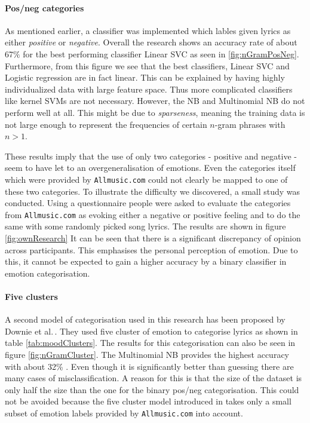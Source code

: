 \documentclass[a4paper,12pt]{article}
\begin{document}
\paragraph{Pos/neg categories} As mentioned earlier, a classifier was implemented which lables given lyrics as either \textit{positive} or \textit{negative}. Overall the research shows an accuracy rate of about 67$\%$ for the best performing classifier Linear SVC as seen in \ref{fig:nGramPosNeg}. Furthermore, from this figure we see that the best classifiers, Linear SVC and Logistic regression are in fact linear. This can be explained by having highly individualized data with large feature space. Thus more complicated classifiers like kernel SVMs are not necessary. However, the NB and Multinomial NB do not perform well at all. This might be due to \textit{sparseness}, meaning the training data is not large enough to represent the frequencies of certain $n$-gram phrases with $n > 1$.

These results imply that the use of only two categories - positive and negative - seem to have let to an overgeneralisation of emotions. Even the categories itself which were provided by \texttt{Allmusic.com} could not clearly be mapped to one of these two categories. To illustrate the difficulty we discovered, a small study was conducted. Using a questionnaire people were asked to evaluate the categories from \texttt{Allmusic.com} as evoking either a negative or positive feeling and to do the same with some randomly picked song lyrics. The results are shown in figure \ref{fig:ownResearch} It can be seen that there is a significant discrepancy of opinion across participants. This emphasises the personal perception of emotion. Due to this, it cannot be expected to gain a higher accuracy by a binary classifier in emotion categorisation.


\paragraph{Five clusters} A second model of categorisation used in this research has been proposed by Downie et al.\,\cite{downie20082007}. They used five cluster of emotion to categorise lyrics as shown in table \ref{tab:moodClusters}. The results for this categorisation can also be seen in figure \ref{fig:nGramCluster}. The Multinomial NB provides the highest accuracy with about 32\% . Even though it is significantly better than guessing there are many cases of misclassification. A reason for this is that the size of the dataset is only half the size than the one for the binary pos/neg categorisation. This could not be avoided because the five cluster model introduced in \cite{downie20082007} takes only a small subset of emotion labels provided by \texttt{Allmusic.com} into account.
\end{document}
